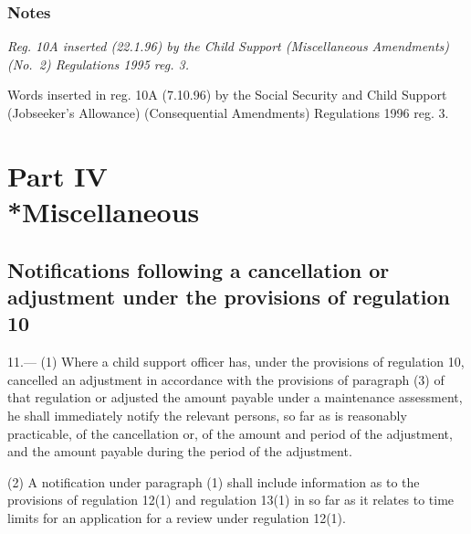 \documentclass[a4paper]{article}
\newcommand{\parthead}{}
\newcommand\amendment[1]{\subsubsection*{Notes}{\itshape\frenchspacing\footnotesize #1 \par}}
\begin{document}
\amendment{
Reg. 10A inserted (22.1.96) by the Child Support (Miscellaneous Amendments) (No.\ 2) Regulations 1995 reg. 3.

Words inserted in reg. 10A (7.10.96) by the Social Security and Child Support (Jobseeker's Allowance) (Consequential Amendments) Regulations 1996 reg. 3.
}

\section[Part IV --- Miscellaneous]{Part IV\\*Miscellaneous}

\renewcommand\parthead{--- Part IV}

\subsection[11. Notifications following a cancellation or adjustment under the provisions of regulation 10]{Notifications following a cancellation or adjustment under the provisions of regulation 10}

11.—%
(1) Where a child support officer has, under the provisions of regulation 10, cancelled an adjustment in accordance with the provisions of paragraph (3) of that regulation or adjusted the amount payable under a maintenance assessment, he shall immediately notify the relevant persons, so far as is reasonably practicable, of the cancellation or, of the amount and period of the adjustment, and the amount payable during the period of the adjustment.

(2) A notification under paragraph (1) shall include information as to the provisions of regulation 12(1) and regulation 13(1) in so far as it relates to time limits for an application for a review under regulation 12(1).
\end{document}
